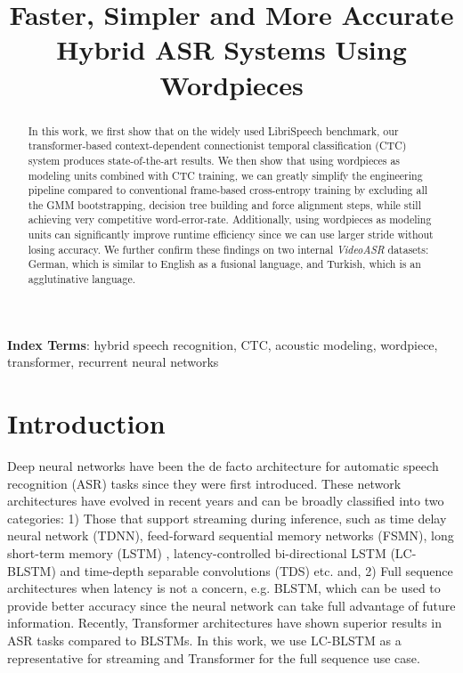 \documentclass[a4paper]{article}
\title{Faster, Simpler and More Accurate Hybrid ASR Systems Using Wordpieces}
\begin{document}
\ninept
\maketitle
\begin{abstract} In this work, we first show that on the widely used LibriSpeech benchmark, our transformer-based context-dependent connectionist temporal classification (CTC) system produces state-of-the-art results. We then show that using wordpieces as modeling units combined with CTC training, we can greatly simplify the engineering pipeline compared to conventional frame-based cross-entropy training by excluding all the GMM bootstrapping, decision tree building and force alignment steps, while still achieving very competitive word-error-rate. Additionally, using wordpieces as modeling units can significantly improve runtime efficiency since we can use larger stride without losing accuracy. We further confirm these findings on two internal \emph{VideoASR} datasets: German, which is similar to English as a fusional language, and Turkish, which is an agglutinative language.
\end{abstract}
\noindent\textbf{Index Terms}: hybrid speech recognition, CTC, acoustic modeling, wordpiece, transformer, recurrent neural networks

\section{Introduction}
\label{sec:intro}

Deep neural networks have been the de facto architecture for automatic speech recognition (ASR) tasks since they were first introduced\cite{hinton2012deep}. These network architectures have evolved in recent years and can be broadly classified into two categories: 1) Those that support streaming during inference, such as time delay neural network (TDNN)\cite{peddinti2015time}, feed-forward sequential memory networks (FSMN)\cite{zhang2015feedforward}, long short-term memory (LSTM) \cite{sak2014long}, latency-controlled bi-directional LSTM (LC-BLSTM)\cite{zhang2016highway, le2019senones} and time-depth separable convolutions (TDS) \cite{hannun2019sequence} etc. and, 2) Full sequence architectures when latency is not a concern, e.g. BLSTM\cite{luscher2019rwth}, which can be used to provide better accuracy since the neural network can take full advantage of future information. Recently, Transformer\cite{vaswani2017attention} architectures have shown superior results in ASR tasks compared to BLSTMs\cite{wang2019transformerbased, karita2019comparative, sperber2018self,synnaeve2019endtoend}. In this work, we use LC-BLSTM as a representative for streaming and Transformer for the full sequence use case. 
    
\end{document}
